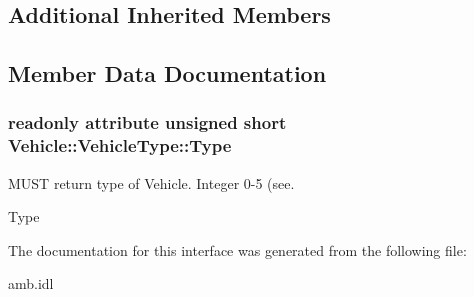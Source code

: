 \subsection*{Additional Inherited Members}


\subsection{Member Data Documentation}
\hypertarget{interfaceVehicle_1_1VehicleType_a8c8213ea9197f85da85cfda90ad2a651}{
\subsubsection[{Type}]{\setlength{\rightskip}{0pt plus 5cm}readonly attribute unsigned short Vehicle\-::\-Vehicle\-Type\-::\-Type}}\label{interfaceVehicle_1_1VehicleType_a8c8213ea9197f85da85cfda90ad2a651}


M\-U\-S\-T return type of Vehicle. Integer 0-\/5 (see. 

Type 

The documentation for this interface was generated from the following file\-:\begin{DoxyCompactItemize}
\item 
amb.\-idl\end{DoxyCompactItemize}
